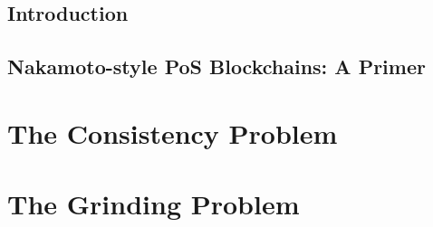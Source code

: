 \documentclass[11pt,oneside]{book}
\begin{document}

\singlespacing

\setcounter{tocdepth}{1}
\tableofcontents

\listoffigures
\begingroup
\let\clearpage\relax%
\listoftables
\endgroup


\thispagestyle{plain}
\mainmatter
\doublespacing




\chapter{Introduction}\label{sec:intro-main}


\chapter{Nakamoto-style PoS Blockchains: A Primer}\label{sec:pos-primer}


\renewcommand{\PartPrefix}{multihonest}
\part{The Consistency Problem}\label{part:multihonest}


\renewcommand{\PartPrefix}{praos}
\part{The Grinding Problem}\label{part:praos}


\renewcommand{\PartPrefix}{xorgames}
\end{document}

